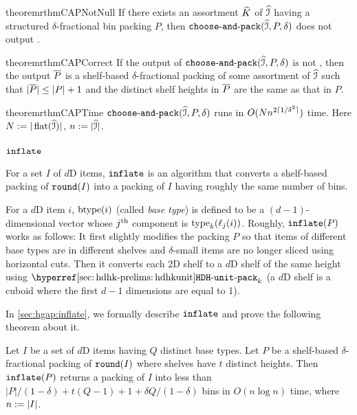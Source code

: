 \begin{restatable}{theorem}{rthmCAPNotNull}
\label{thm:hgap:cap-not-null}
If there exists an assortment $\widehat{K}$ of $\widehat{\mathcal{I}}$ having
a structured $\delta$-fractional bin packing $P$,
then $\operatorname{\mathtt{choose-and-pack}}(\widehat{\mathcal{I}}, P, \delta)$ does not output \Null.
\end{restatable}
\begin{restatable}{theorem}{rthmCAPCorrect}
\label{thm:hgap:cap-correct}
If the output of $\operatorname{\mathtt{choose-and-pack}}(\widehat{\mathcal{I}}, P, \delta)$ is not \Null,
then the output $\overline{P}$ is a shelf-based $\delta$-fractional packing of some assortment
of $\widehat{\mathcal{I}}$ such that $|\overline{P}| \le |P| + 1$
and the distinct shelf heights in $\overline{P}$ are the same as that in $P$.
\end{restatable}
\begin{restatable}{theorem}{rthmCAPTime}
\label{thm:hgap:cap-time}
$\operatorname{\mathtt{choose-and-pack}}(\widehat{\mathcal{I}}, P, \delta)$ runs in $O(Nn^{2\lceil 1/\delta^2 \rceil})$ time.
Here $N := |\operatorname{flat}(\widehat{\mathcal{I}})|$, $n := |\widehat{\mathcal{I}}|$.
\end{restatable}

\subsubsection{\texorpdfstring{$\operatorname{\mathtt{inflate}}$}{inflate}}

For a set $I$ of $d$D items, $\operatorname{\mathtt{inflate}}$ is an algorithm that
converts a shelf-based packing of $\operatorname{\mathtt{round}}(I)$ into a packing of $I$
having roughly the same number of bins.

For a $d$D item $i$, $\operatorname{btype}(i)$ (called \emph{base type}) is defined to be
a $(d-1)$-dimensional vector whose $j^{\textrm{th}}$ component is $\operatorname{type}_k(\ell_j(i))$.
Roughly, $\operatorname{\mathtt{inflate}}(P)$ works as follows:
It first slightly modifies the packing $P$ so that
items of different base types are in different shelves and
$\delta$-small items are no longer sliced using horizontal cuts.
Then it converts each 2D shelf to a $d$D shelf of the same height using $\hdhkunitHyp$
(a $d$D shelf is a cuboid where the first $d-1$ dimensions are equal to 1).

In \cref{sec:hgap:inflate}, we formally describe $\operatorname{\mathtt{inflate}}$ and prove the following theorem about it.
\begin{theorem}
\label{thm:hgap:inflate}
Let $I$ be a set of $d$D items having $Q$ distinct base types.
Let $P$ be a shelf-based $\delta$-fractional packing of $\operatorname{\mathtt{round}}(I)$
where shelves have $t$ distinct heights.
Then $\operatorname{\mathtt{inflate}}(P)$ returns a packing of $I$ into less than
$|P|/(1-\delta) + t(Q-1) + 1 + \delta Q/(1-\delta)$ bins
in $O(n\log n)$ time, where $n := |I|$.
\end{theorem}

